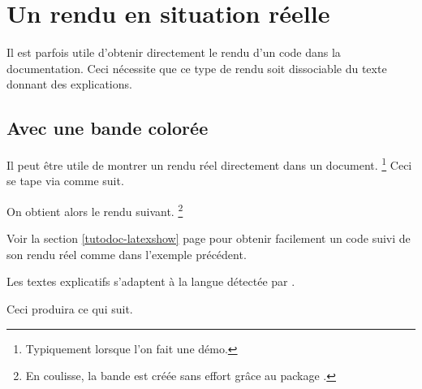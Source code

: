 \documentclass{tutodoc}
\begin{document}
\section{Un rendu en situation réelle}
\label{tutodoc-showcase}

Il est parfois utile d'obtenir directement le rendu d'un code dans la documentation. Ceci nécessite que ce type de rendu soit dissociable du texte donnant des explications.



\subsection{Avec une bande colorée}

\begin{tdocexa}
    Il peut être utile de montrer un rendu réel directement dans un document.
    \footnote{
        Typiquement lorsque l'on fait une démo.
    }
    Ceci se tape via  comme suit.


    On obtient alors le rendu suivant.
    \footnote{
        En coulisse, la bande est créée sans effort grâce au package .
    }

    \medskip

    
\end{tdocexa}


\begin{tdocrem}
    Voir la section \ref{tutodoc-latexshow} page \pageref{tutodoc-latexshow} pour obtenir facilement un code suivi de son rendu réel comme dans l'exemple précédent.
\end{tdocrem}


\begin{tdocnote}
    Les textes explicatifs s'adaptent à la langue détectée par \thisproj.
\end{tdocnote}


\begin{tdocexa}
    \leavevmode


    Ceci produira ce qui suit.

    \medskip

    
\end{tdocexa}
\end{document}
